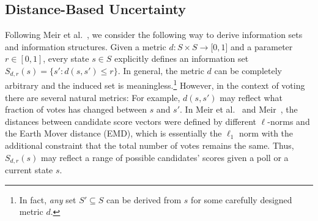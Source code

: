 \documentclass[letterpaper]{article} %
\begin{document}
\subsection{Distance-Based Uncertainty}
Following Meir et al.~, we consider the following way to derive information sets and information structures.
 Given a metric $d:S\times S\rightarrow \mathbb [0,1]$ and a parameter $r\in [0,1]$, every state $s\in S$ explicitly defines an information set $S_{d,r}(s)=\{s' : d(s,s')\leq r\}$. In general, the metric $d$ can be completely arbitrary and the induced set is meaningless.\footnote{In fact, \emph{any} set $S'\subseteq S$ can be derived from $s$ for some carefully designed metric $d$.} However, in the context of voting there are several natural metrics: For example, $d(s,s')$ may reflect what fraction of votes has changed between $s$ and $s'$.
 In Meir et al.~ and Meir~, the distances between candidate score vectors were defined by different $\ell$-norms and the Earth Mover distance (EMD), 	which is essentially the $\ell_1$ norm with the additional constraint that the total number of votes remains the same. Thus, $S_{d,r}(s)$ may reflect a range of possible candidates' scores given a poll or a current state $s$.
\end{document}
